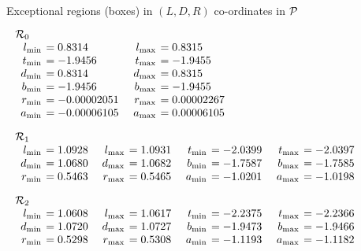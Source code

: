  Exceptional 
regions (boxes) in $(L,D,R)$ co-ordinates in ${\cal P}$
\begin{small}
$$
\begin{array}{rlrl}
\noalign{\noindent  ${\cal R}_0$}
\noalign{\vskip2pt}
l_{\rm min} &\hskip-6pt =  0.8314&\enspace    l_{\rm max}&\hskip-6pt  = 0.8315\\
t_{\rm min} &\hskip-6pt =  -1.9456&\enspace    t_{\rm max}&\hskip-6pt  = -1.9455\\
d_{\rm min} &\hskip-6pt =  0.8314&  d_{\rm
max}&\hskip-6pt  = 0.8315\\   b_{\rm min} &\hskip-6pt =  -1.9456&  b_{\rm max} &\hskip-6pt = -1.9455\\
r_{\rm min} &\hskip-6pt =  -0.00002051&  r_{\rm max} &\hskip-6pt = 0.00002267\\  a_{\rm min} &\hskip-6pt =  -0.00006105&  a_{\rm
max}&\hskip-6pt  = 0.00006105\end{array}
$$



$$\begin{array}{rlrlrlrl}
\noalign{\noindent  ${\cal R}_1$}
\noalign{\vskip2pt}
l_{\rm min} &\hskip-6pt =  1.0928&\enspace    l_{\rm max} &\hskip-6pt = 1.0931&\enspace   
t_{\rm min} &\hskip-6pt =  -2.0399&\enspace   t_{\rm max}&\hskip-6pt  = -2.0397\\
d_{\rm min} &\hskip-6pt =  1.0680&  d_{\rm
max}&\hskip-6pt  = 1.0682&   b_{\rm min} &\hskip-6pt =  -1.7587&  b_{\rm max} &\hskip-6pt = -1.7585\\
r_{\rm min} &\hskip-6pt =  0.5463& 
r_{\rm max}&\hskip-6pt  = 0.5465&   a_{\rm min} &\hskip-6pt =  -1.0201&  a_{\rm max}&\hskip-6pt  = -1.0198\end{array}$$

$$\begin{array}{rlrlrlrl}\noalign{\noindent  ${\cal R}_2$}
\noalign{\vskip2pt}
l_{\rm min} &\hskip-6pt =  1.0608&\enspace    l_{\rm max} &\hskip-6pt = 1.0617&\enspace   
t_{\rm min} &\hskip-6pt =  -2.2375&\enspace    t_{\rm max} &\hskip-6pt = -2.2366\\
d_{\rm min} &\hskip-6pt =  1.0720&  d_{\rm
max}&\hskip-6pt  = 1.0727&   b_{\rm min} &\hskip-6pt =  -1.9473&  b_{\rm max} &\hskip-6pt = -1.9466\\
r_{\rm min} &\hskip-6pt =  0.5298& 
r_{\rm max} &\hskip-6pt = 0.5308&   a_{\rm min} &\hskip-6pt =  -1.1193&  a_{\rm max} &\hskip-6pt = -1.1182\end{array}$$


\end{small}

